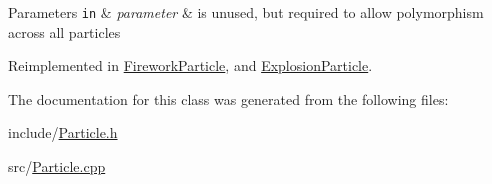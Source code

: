 \begin{DoxyParams}[1]{Parameters}
\mbox{\tt in}  & {\em parameter} & is unused, but required to allow polymorphism across all particles \\
\hline
\end{DoxyParams}


Reimplemented in \hyperlink{classFireworkParticle_aacfe5d5991b4585c176d9e2315d0d293}{Firework\-Particle}, and \hyperlink{classExplosionParticle_ac1c36920bf241f397c639fdaac40a9f9}{Explosion\-Particle}.



The documentation for this class was generated from the following files\-:\begin{DoxyCompactItemize}
\item 
include/\hyperlink{Particle_8h}{Particle.\-h}\item 
src/\hyperlink{Particle_8cpp}{Particle.\-cpp}\end{DoxyCompactItemize}
